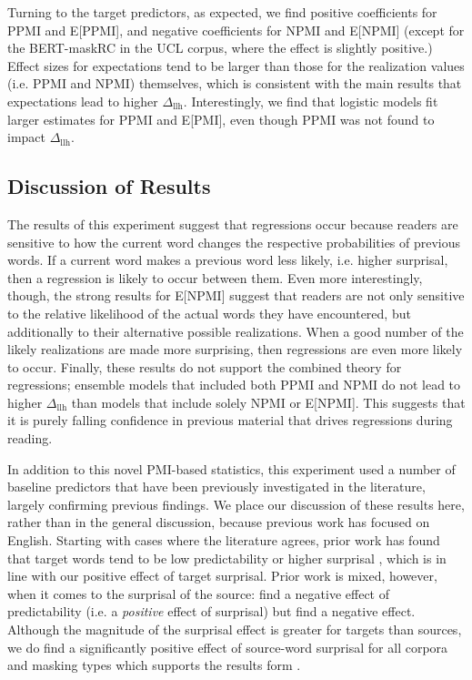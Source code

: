 \documentclass[12pt]{article}
\newcommand{\dllmath}{\Delta_{\mathrm{llh}}}
\newcommand{\dll}{$\dllmath$\xspace}
\begin{document}
Turning to the target predictors, as expected, we find positive coefficients for PPMI and E[PPMI], and negative coefficients for NPMI and E[NPMI] (except for the BERT-maskRC in the UCL corpus, where the effect is slightly positive.) Effect sizes for expectations tend to be larger than those for the realization values (i.e. PPMI and NPMI) themselves, which is consistent with the main results that expectations lead to higher \dll. Interestingly, we find that logistic models fit larger estimates for PPMI and E[PMI], even though PPMI was not found to impact \dll.

\subsection{Discussion of Results}

The results of this experiment suggest that regressions occur because readers are sensitive to how the current word changes the respective probabilities of previous words. If a current word makes a previous word less likely, i.e. higher surprisal, then a regression is likely to occur between them. Even more interestingly, though, the strong results for E[NPMI] suggest that readers are not only sensitive to the relative likelihood of the actual words they have encountered, but additionally to their alternative possible realizations. When a good number of the likely realizations are made more surprising, then regressions are even more likely to occur. Finally, these results do not support the combined theory for regressions; ensemble models that included both PPMI and NPMI do not lead to higher \dll than models that include solely NPMI or E[NPMI]. This suggests that it is purely falling confidence in previous material that drives regressions during reading.

In addition to this novel PMI-based statistics, this experiment used a number of baseline predictors that have been previously investigated in the literature, largely confirming previous findings. We place our discussion of these results here, rather than in the general discussion, because previous work has focused on English. Starting with cases where the literature agrees, prior work has found that target words tend to be low predictability \citep{rayner2004effects, kliegl2004length} or higher surprisal \citep{bicknell2011readers}, which is in line with our positive effect of target surprisal. Prior work is mixed, however, when it comes to the surprisal of the source: \citet{bicknell2011readers} find a negative effect of predictability (i.e. a \textit{positive} effect of surprisal) but \cite{lopopolo2019dependency} find a negative effect. Although the magnitude of the surprisal effect is greater for targets than sources, we do find a significantly positive effect of source-word surprisal for all corpora and masking types which supports the results form \citet{bicknell2011readers}.
\end{document}
